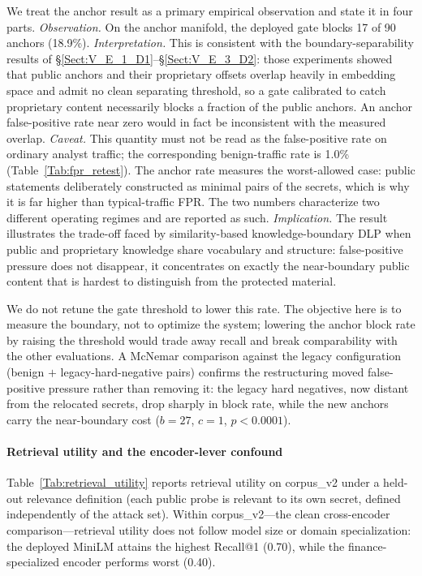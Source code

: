 \documentclass[journal]{IEEEtran}
\begin{document}
We treat the anchor result as a primary empirical observation and state it in
four parts.
\emph{Observation.} On the anchor manifold, the deployed gate blocks 17 of 90
anchors (18.9\%).
\emph{Interpretation.} This is consistent with the boundary-separability
results of \S\ref{Sect:V_E_1_D1}--\S\ref{Sect:V_E_3_D2}: those experiments
showed that public anchors and their proprietary offsets overlap heavily in
embedding space and admit no clean separating threshold, so a gate calibrated
to catch proprietary content necessarily blocks a fraction of the public
anchors. An anchor false-positive rate near zero would in fact be inconsistent
with the measured overlap.
\emph{Caveat.} This quantity must not be read as the false-positive rate on
ordinary analyst traffic; the corresponding benign-traffic rate is 1.0\%
(Table~\ref{Tab:fpr_retest}). The anchor rate measures the worst-allowed case:
public statements deliberately constructed as minimal pairs of the secrets,
which is why it is far higher than typical-traffic FPR. The two numbers
characterize two different operating regimes and are reported as such.
\emph{Implication.} The result illustrates the trade-off faced by
similarity-based knowledge-boundary DLP when public and proprietary knowledge
share vocabulary and structure: false-positive pressure does not disappear, it
concentrates on exactly the near-boundary public content that is hardest to
distinguish from the protected material.

We do not retune the gate threshold to lower this rate. The objective here is
to measure the boundary, not to optimize the system; lowering the anchor block
rate by raising the threshold would trade away recall and break comparability
with the other evaluations. A McNemar comparison against the legacy
configuration (benign $+$ legacy-hard-negative pairs) confirms the
restructuring moved false-positive pressure rather than removing it: the legacy
hard negatives, now distant from the relocated secrets, drop sharply in block
rate, while the new anchors carry the near-boundary cost ($b{=}27$, $c{=}1$,
$p<0.0001$).

\paragraph{Retrieval utility and the encoder-lever confound}
Table~\ref{Tab:retrieval_utility} reports retrieval utility on corpus\_v2 under
a held-out relevance definition (each public probe is relevant to its own
secret, defined independently of the attack set). Within corpus\_v2---the clean
cross-encoder comparison---retrieval utility does not follow model size or
domain specialization: the deployed MiniLM attains the highest Recall@1
(0.70), while the finance-specialized encoder performs worst (0.40).
\end{document}
